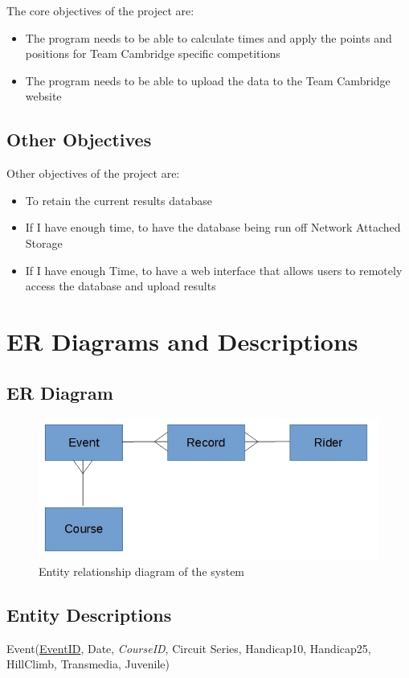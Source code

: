 The core objectives of the project are:
\begin{itemize}
	\item The program needs to be able to calculate times and apply the points and positions for Team Cambridge specific competitions
	\item The program needs to be able to upload the data to the Team Cambridge website
\end{itemize}
\subsection{Other Objectives}
Other objectives of the project are:
\begin{itemize}
	\item To retain the current results database
	\item If I have enough time, to have the database being run off Network Attached Storage
	\item If I have enough Time, to have a web interface that allows users to remotely access the database and upload results
\end{itemize}

\section{ER Diagrams and Descriptions}

\subsection{ER Diagram}

\begin{figure}[H]
	\includegraphics[width=\textwidth]{./ER/ER.jpg}
	\caption{Entity relationship diagram of the system}
\end{figure}


\subsection{Entity Descriptions}
Event(\underline{EventID}, Date, \emph{CourseID}, Circuit Series, Handicap10, Handicap25, HillClimb, Transmedia, Juvenile)

